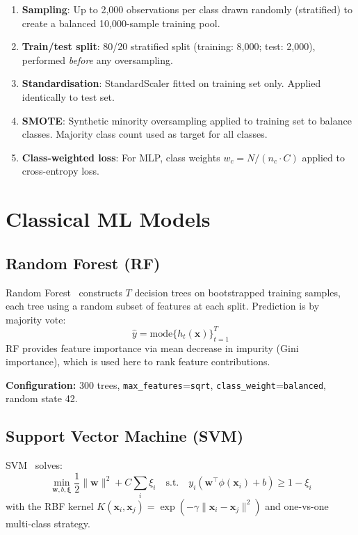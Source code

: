 \documentclass[journal]{IEEEtran}
\newcommand{\vect}[1]{\boldsymbol{#1}}
\begin{document}
\begin{enumerate}
  \item \textbf{Sampling}: Up to 2,000 observations per class drawn randomly
        (stratified) to create a balanced 10,000-sample training pool.
  \item \textbf{Train/test split}: 80/20 stratified split (training: 8,000;
        test: 2,000), performed \emph{before} any oversampling.
  \item \textbf{Standardisation}: StandardScaler fitted on training set only.
        Applied identically to test set.
  \item \textbf{SMOTE}: Synthetic minority oversampling applied to training set
        to balance classes. Majority class count used as target for all classes.
  \item \textbf{Class-weighted loss}: For MLP, class weights
        $w_c = N/(n_c \cdot C)$ applied to cross-entropy loss.
\end{enumerate}

\section{Classical ML Models}
\label{sec:models}

\subsection{Random Forest (RF)}

Random Forest~\cite{breiman2001random} constructs $T$ decision trees on
bootstrapped training samples, each tree using a random subset of features at
each split. Prediction is by majority vote:
\begin{equation}
  \hat{y} = \text{mode}\{h_t(\vect{x})\}_{t=1}^T
\end{equation}
RF provides feature importance via mean decrease in impurity (Gini importance),
which is used here to rank feature contributions.

\textbf{Configuration:} 300 trees, \texttt{max\_features}=\texttt{sqrt},
\texttt{class\_weight}=\texttt{balanced}, random state 42.

\subsection{Support Vector Machine (SVM)}

SVM~\cite{cortes1995support} solves:
\begin{equation}
  \min_{\vect{w},b,\vect{\xi}} \frac{1}{2}\|\vect{w}\|^2 + C\sum_i \xi_i
  \quad \text{s.t.} \quad y_i(\vect{w}^\top\phi(\vect{x}_i)+b) \geq 1 - \xi_i
\end{equation}
with the RBF kernel $K(\vect{x}_i, \vect{x}_j) = \exp(-\gamma\|\vect{x}_i-\vect{x}_j\|^2)$
and one-vs-one multi-class strategy.
\end{document}
